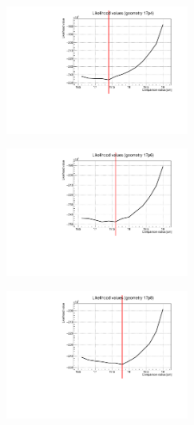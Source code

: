 \documentclass[a4paper, 11pt, twoside, openright]{report}
\begin{document}
\begin{figure}[htbp]
\begin{minipage}[b]{.32\textwidth}
\includegraphics[width=6cm, height=4.6cm]{figs/likelihood100LowStat/likelihood17p4.pdf}
\end{minipage}\hfill
\begin{minipage}[b]{.32\textwidth}
\includegraphics[width=6cm, height=4.6cm]{figs/likelihood100LowStat/likelihood17p6.pdf}
\end{minipage} \hfill
\begin{minipage}[b]{.32\textwidth}
\includegraphics[width=6cm, height=4.6cm]{figs/likelihood100LowStat/likelihood17p8.pdf}
\end{minipage} \hfill \vspace{10pt}


\end{figure}
\end{document}
